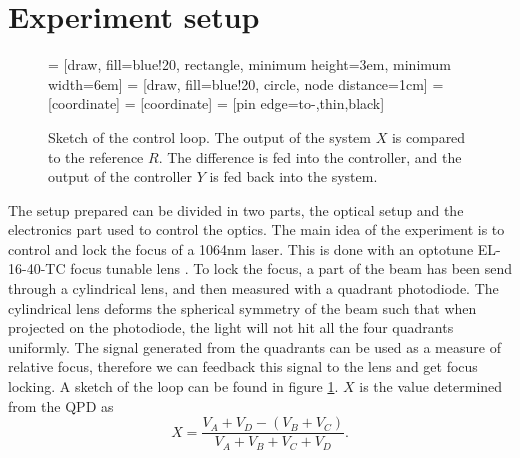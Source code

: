 \documentclass[a4paper,10pt]{article}
\begin{document}
\section{Experiment setup}
\begin{figure}[htp!]
    \centering
     = [draw, fill=blue!20, rectangle,
    minimum height=3em, minimum width=6em]
     = [draw, fill=blue!20, circle, node distance=1cm]
     = [coordinate]
     = [coordinate]
     = [pin edge={to-,thin,black}]

\caption{Sketch of the control loop. The output of the system $X$ is compared to the reference $R$. The difference is fed into the controller, and the output of the controller $Y$ is fed back into the system. }
\label{fig:control_loop}
\end{figure}
The setup prepared can be divided in two parts, the optical setup and the electronics part used to control the optics. The main idea of the experiment is to control and lock the focus of a 1064nm laser. This is done with an optotune EL-16-40-TC focus tunable lens \cite{lens_datasheet}. To lock the focus, a part of the beam has been send through a cylindrical lens, and then measured with a quadrant photodiode. The cylindrical lens deforms the spherical symmetry of the beam such that when projected on the photodiode, the light will not hit all the four quadrants uniformly. The signal generated from the quadrants can be used as a measure of relative focus, therefore we can feedback this signal to the lens and get focus locking. A sketch of the loop can be found in figure \ref{fig:control_loop}. $X$ is the value determined from the QPD as
\[X = \frac{V_A + V_D - (V_B+V_C)}{V_A+V_B+V_C+V_D}.\]
\end{document}
